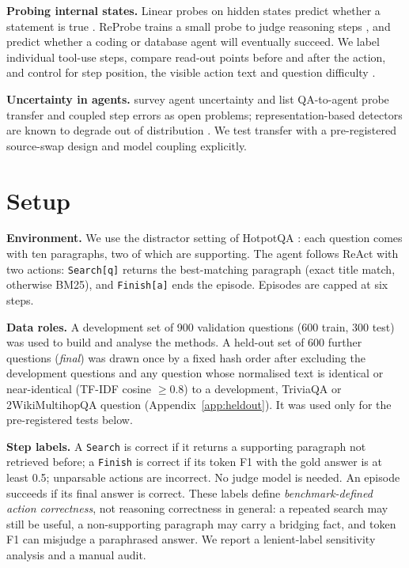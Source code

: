 \documentclass[11pt]{article}
\newcommand{\search}{\texttt{Search}}
\newcommand{\finish}{\texttt{Finish}}
\begin{document}
\textbf{Probing internal states.} Linear probes on hidden states predict whether a statement is true
\citep{azaria2023internal,marks2023geometry}. ReProbe trains a small probe to judge reasoning steps
\citep{ni2026reprobe}, and \citet{mammen2026agents} predict whether a coding or database agent will eventually
succeed. We label individual tool-use steps, compare read-out points before and after the action, and control for
step position, the visible action text and question difficulty \citep{esfandyari2026disentangling}.

\textbf{Uncertainty in agents.} \citet{lin2026uqagents} survey agent uncertainty and list QA-to-agent probe
transfer and coupled step errors as open problems; representation-based detectors are known to degrade out of
distribution \citep{dubanowska2025representation}. We test transfer with a pre-registered source-swap design and
model coupling explicitly.

\section{Setup}
\textbf{Environment.} We use the distractor setting of HotpotQA \citep{yang2018hotpotqa}: each question comes with
ten paragraphs, two of which are supporting. The agent follows ReAct \citep{yao2023react} with two actions:
\search{}\texttt{[q]} returns the best-matching paragraph (exact title match, otherwise BM25), and
\finish{}\texttt{[a]} ends the episode. Episodes are capped at six steps.

\textbf{Data roles.} A development set of 900 validation questions (600 train, 300 test) was used to build and
analyse the methods. A held-out set of 600 further questions (\emph{final}) was drawn once by a fixed hash order
after excluding the development questions and any question whose normalised text is identical or near-identical
(TF-IDF cosine $\ge0.8$) to a development, TriviaQA or 2WikiMultihopQA question (Appendix~\ref{app:heldout}). It
was used only for the pre-registered tests below.

\textbf{Step labels.} A \search{} is correct if it returns a supporting paragraph not retrieved before; a
\finish{} is correct if its token F1 with the gold answer is at least 0.5; unparsable actions are incorrect.
No judge model is needed. An episode succeeds if its final answer is correct. These labels define
\emph{benchmark-defined action correctness}, not reasoning correctness in general: a repeated search may still be
useful, a non-supporting paragraph may carry a bridging fact, and token F1 can misjudge a paraphrased answer. We
report a lenient-label sensitivity analysis and a manual audit.
\end{document}
